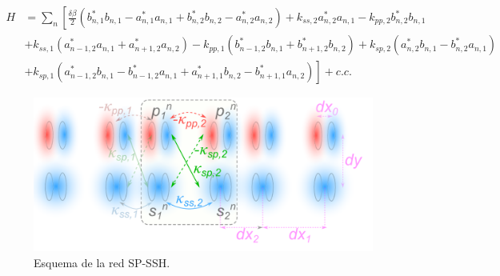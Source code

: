 \begin{align*}
	H &= \sum_n \left[\frac{\delta\beta}{2} \left( b^*_{n, 1} b_{n, 1} - a^*_{n, 1} a_{n, 1} + b^*_{n, 2} b_{n, 2} - a^*_{n, 2} a_{n, 2} \right) +k_{ss, 2}a^*_{n, 2} a_{n, 1} -k_{pp, 2}b^*_{n, 2} b_{n, 1} \right. 
	\\	
	&+ k_{ss, 1} \left( a_{n-1, 2}^*a_{n, 1} + a_{n+1, 2}^*a_{n, 2} \right) - k_{pp, 1} \left( b_{n-1, 2}^*b_{n, 1} + b_{n+1, 2}^*b_{n, 2} \right) + k_{sp, 2} \left( a_{n, 2}^* b_{n, 1} - b_{n, 2}^* a_{n, 1} \right)
	\\
	&+ \left. k_{sp, 1} \left( a_{n-1, 2}^* b_{n, 1} - b_{n-1, 2}^* a_{n, 1} + a_{n+1, 1}^*b_{n, 2} - b_{n+1, 1}^* a_{n, 2} \right) \right] + c.c.
\end{align*}

\begin{figure}[H]
\centering
	\includegraphics[width=0.7\linewidth]{media/ssh_sp_model}
	\caption{Esquema de la red SP-SSH.}
\end{figure}